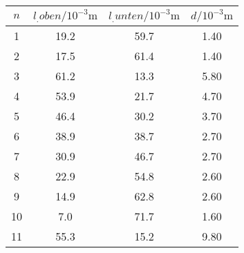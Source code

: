 \label{tab:tabAScan2MHzRef}
	\begin{tabular}{S[table-format=1.0]S[table-format=2.1]S[table-format=2.1]S[table-format=2.2]}
		\toprule
		{$n$} & {$l_.{oben}/10^{-3}\si{\metre}$} & {$l_.{unten}/10^{-3}\si{\metre}$} & {$d/10^{-3}\si{\metre}$} \\
		 & 19.2 & 59.7 & 1.40 \\
		2 & 17.5 & 61.4 & 1.40 \\
		3 & 61.2 & 13.3 & 5.80 \\
		4 & 53.9 & 21.7 & 4.70 \\
		5 & 46.4 & 30.2 & 3.70 \\
		6 & 38.9 & 38.7 & 2.70 \\
		7 & 30.9 & 46.7 & 2.70 \\
		8 & 22.9 & 54.8 & 2.60 \\
		9 & 14.9 & 62.8 & 2.60 \\
		10 & 7.0 & 71.7 & 1.60 \\
		11 & 55.3 & 15.2 & 9.80 \\
		\bottomrule
	\end{tabular}
